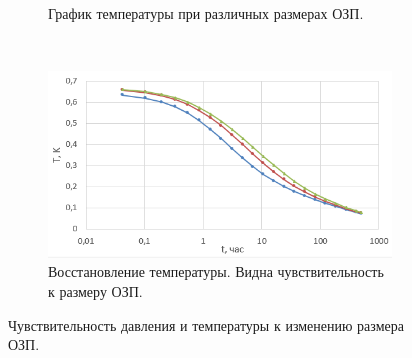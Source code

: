 \begin{figure}[H]
\begin{subfigure}[b]{0.5\textwidth}
		\caption{График температуры при различных размерах ОЗП.}
		\label{pic:temp_sens}
	\end{subfigure}
~
	\begin{subfigure}[b]{0.5\textwidth}
		\centering
		\includegraphics[width=1\textwidth]{pic/temp_sens1.png}
		\caption{Восстановление температуры. Видна чувствительность к размеру ОЗП.}
		\label{pic:temp_sens1}
	\end{subfigure}
	\caption{Чувствительность давления и температуры к изменению размера ОЗП.}
	\label{pic:sens_fes}
\end{figure}

